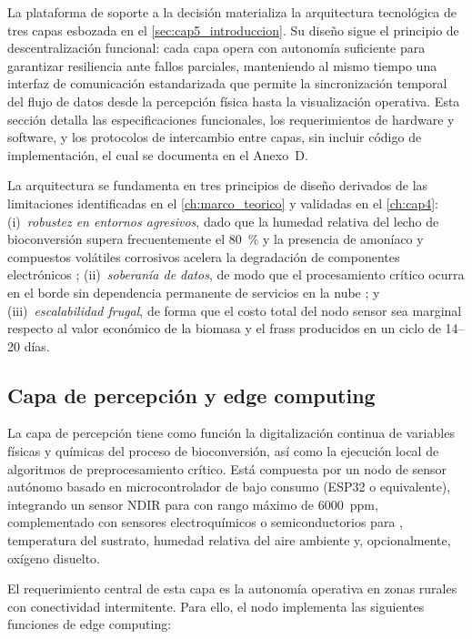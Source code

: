 La plataforma de soporte a la decisión materializa la arquitectura tecnológica de tres capas esbozada en el \cref{sec:cap5_introduccion}. Su diseño sigue el principio de descentralización funcional: cada capa opera con autonomía suficiente para garantizar resiliencia ante fallos parciales, manteniendo al mismo tiempo una interfaz de comunicación estandarizada que permite la sincronización temporal del flujo de datos desde la percepción física hasta la visualización operativa. Esta sección detalla las especificaciones funcionales, los requerimientos de hardware y software, y los protocolos de intercambio entre capas, sin incluir código de implementación, el cual se documenta en el Anexo~D.

La arquitectura se fundamenta en tres principios de diseño derivados de las limitaciones identificadas en el \cref{ch:marco_teorico} y validadas en el \cref{ch:cap4}: (i)~\textit{robustez en entornos agresivos}, dado que la humedad relativa del lecho de bioconversión supera frecuentemente el \num{80}~\% y la presencia de amoníaco y compuestos volátiles corrosivos acelera la degradación de componentes electrónicos \parencite{duobieneDevelopmentWirelessSensor2022}; (ii)~\textit{soberanía de datos}, de modo que el procesamiento crítico ocurra en el borde sin dependencia permanente de servicios en la nube \parencite{rajRealTimeEstimation2023}; y (iii)~\textit{escalabilidad frugal}, de forma que el costo total del nodo sensor sea marginal respecto al valor económico de la biomasa y el frass producidos en un ciclo de \num{14}--\num{20} días.

\subsection{Capa de percepción y edge computing}
\label{subsec:cap5_percepcion}

La capa de percepción tiene como función la digitalización continua de variables físicas y químicas del proceso de bioconversión, así como la ejecución local de algoritmos de preprocesamiento crítico. Está compuesta por un nodo de sensor autónomo basado en microcontrolador de bajo consumo (ESP32 o equivalente), integrando un sensor NDIR para  con rango máximo de \num{6000}~ppm, complementado con sensores electroquímicos o semiconductorios para , temperatura del sustrato, humedad relativa del aire ambiente y, opcionalmente, oxígeno disuelto.

El requerimiento central de esta capa es la autonomía operativa en zonas rurales con conectividad intermitente. Para ello, el nodo implementa las siguientes funciones de edge computing:

